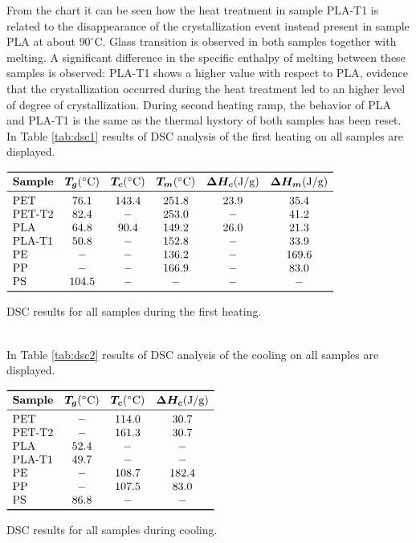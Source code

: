 \documentclass[a4paper, 11pt]{article}
\begin{document}
From the chart it can be seen how the heat treatment in sample PLA-T1 is related to the disappearance of the crystallization event instead present in sample PLA at about $90^\circ$C. Glass transition is observed in both samples together with melting. A significant difference in the specific enthalpy of melting between these samples is observed: PLA-T1 shows a higher value with respect to PLA, evidence that the crystallization occurred during the heat treatment led to an higher level of degree of crystallization. During second heating ramp, the behavior of PLA and PLA-T1 is the same as the thermal hystory of both samples has been reset.\\
In Table \ref{tab:dsc1} results of DSC analysis of the first heating on all samples are displayed. 
\begin{table}[htp]
\centering
$
\begin{array}{lccccc}
\toprule
\textbf{Sample} & \bm{T_{g}} (\SI{}{\celsius}) & \bm{T_{c}} (\SI{}{\celsius}) & \bm{T_m} (\SI{}{\celsius}) & \bm{\Delta H_{c}} (\si{J/g}) & \bm{\Delta H_m} (\si{J/g}) \\
\midrule
\text{PET} & 76.1 & 143.4 & 251.8 & 23.9 & 35.4 \\
\text{PET-T2} & 82.4 & - & 253.0 & - & 41.2 \\
\text{PLA} & 64.8 & 90.4 & 149.2 & 26.0 & 21.3  \\
\text{PLA-T1} & 50.8 & - & 152.8 & - & 33.9 \\
\text{PE} & - & - & 136.2 & - & 169.6  \\
\text{PP} & - & - & 166.9 & - & 83.0  \\
\text{PS} & 104.5 & - & - & - & -  \\
\bottomrule
\end{array}
$
\caption{DSC results for all samples during the first heating.}
\label{tab:dsc1}
\end{table}\\
In Table \ref{tab:dsc2} results of DSC analysis of the cooling on all samples are displayed. 
\begin{table}[htp]
\centering
$
\begin{array}{lccc}
\toprule
\textbf{Sample} & \bm{T_{g}} (\SI{}{\celsius}) & \bm{T_{c}} (\SI{}{\celsius}) & \bm{\Delta H_{c}} (\si{J/g}) \\
\midrule
\text{PET} & - & 114.0 & 30.7  \\
\text{PET-T2} & - & 161.3 & 30.7 \\
\text{PLA} & 52.4 & - & -  \\
\text{PLA-T1} & 49.7 & - & -  \\
\text{PE} & - & 108.7 & 182.4   \\
\text{PP} & - & 107.5 & 83.0   \\
\text{PS} & 86.8 & - & -  \\
\bottomrule
\end{array}
$
\caption{DSC results for all samples during cooling.}
\label{tab:dsc2}
\end{table}
\end{document}
